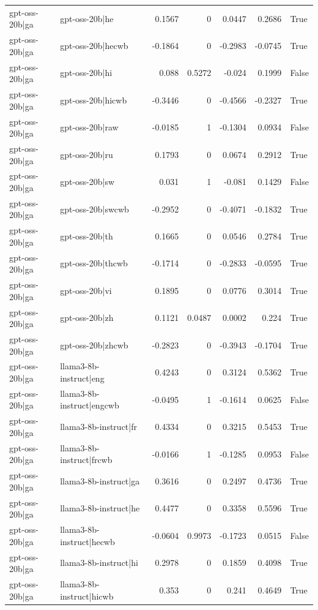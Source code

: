 \begin{table}
\begin{tabular}{l l r r r r l}
gpt-oss-20b|ga & gpt-oss-20b|he & 0.1567 & 0 & 0.0447 & 0.2686 & True \\
gpt-oss-20b|ga & gpt-oss-20b|hecwb & -0.1864 & 0 & -0.2983 & -0.0745 & True \\
gpt-oss-20b|ga & gpt-oss-20b|hi & 0.088 & 0.5272 & -0.024 & 0.1999 & False \\
gpt-oss-20b|ga & gpt-oss-20b|hicwb & -0.3446 & 0 & -0.4566 & -0.2327 & True \\
gpt-oss-20b|ga & gpt-oss-20b|raw & -0.0185 & 1 & -0.1304 & 0.0934 & False \\
gpt-oss-20b|ga & gpt-oss-20b|ru & 0.1793 & 0 & 0.0674 & 0.2912 & True \\
gpt-oss-20b|ga & gpt-oss-20b|sw & 0.031 & 1 & -0.081 & 0.1429 & False \\
gpt-oss-20b|ga & gpt-oss-20b|swcwb & -0.2952 & 0 & -0.4071 & -0.1832 & True \\
gpt-oss-20b|ga & gpt-oss-20b|th & 0.1665 & 0 & 0.0546 & 0.2784 & True \\
gpt-oss-20b|ga & gpt-oss-20b|thcwb & -0.1714 & 0 & -0.2833 & -0.0595 & True \\
gpt-oss-20b|ga & gpt-oss-20b|vi & 0.1895 & 0 & 0.0776 & 0.3014 & True \\
gpt-oss-20b|ga & gpt-oss-20b|zh & 0.1121 & 0.0487 & 0.0002 & 0.224 & True \\
gpt-oss-20b|ga & gpt-oss-20b|zhcwb & -0.2823 & 0 & -0.3943 & -0.1704 & True \\
gpt-oss-20b|ga & llama3-8b-instruct|eng & 0.4243 & 0 & 0.3124 & 0.5362 & True \\
gpt-oss-20b|ga & llama3-8b-instruct|engcwb & -0.0495 & 1 & -0.1614 & 0.0625 & False \\
gpt-oss-20b|ga & llama3-8b-instruct|fr & 0.4334 & 0 & 0.3215 & 0.5453 & True \\
gpt-oss-20b|ga & llama3-8b-instruct|frcwb & -0.0166 & 1 & -0.1285 & 0.0953 & False \\
gpt-oss-20b|ga & llama3-8b-instruct|ga & 0.3616 & 0 & 0.2497 & 0.4736 & True \\
gpt-oss-20b|ga & llama3-8b-instruct|he & 0.4477 & 0 & 0.3358 & 0.5596 & True \\
gpt-oss-20b|ga & llama3-8b-instruct|hecwb & -0.0604 & 0.9973 & -0.1723 & 0.0515 & False \\
gpt-oss-20b|ga & llama3-8b-instruct|hi & 0.2978 & 0 & 0.1859 & 0.4098 & True \\
gpt-oss-20b|ga & llama3-8b-instruct|hicwb & 0.353 & 0 & 0.241 & 0.4649 & True \\

\end{tabular}
\end{table}
